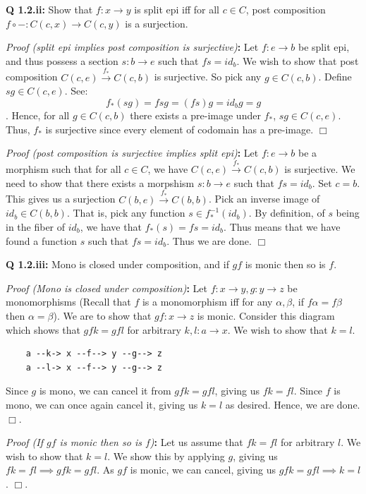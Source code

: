 \documentclass[11pt]{book}
\def\qed{$\Box$}
\newcommand{\beginproof}[1][]{\emph{Proof #1}\textbf{:} }
\newcommand{\question}[1]{\textbf{#1}}
\begin{document}
\question{Q 1.2.ii:} Show that $f: x \rightarrow y$ is split epi iff for all $c \in C$, post composition
$f \circ - : C(c, x) \rightarrow C(c, y)$ is a surjection.


\beginproof[(split epi implies post composition is surjective)]
Let $f: e \rightarrow b$ be split epi, and thus possess a section $s: b \rightarrow e$ such that $fs = id_b$.
We wish to show that post composition $C(c, e) \xrightarrow{f_*} C(c, b)$ is surjective.
So pick any $g \in C(c, b)$. Define $sg \in C(c, e)$. See: $$f_*(sg) = fsg = (fs)g = id_b g = g$$.
Hence, for all $g \in C(c, b)$ there exists a pre-image under $f_*$, $sg \in C(c, e)$. Thus, $f_*$ is surjective
since every element of codomain has a pre-image. \qed


\beginproof[(post composition is surjective implies split epi)]
Let $f: e \to b$ be a morphism such that for all $c \in C$, we have $C(c, e) \xrightarrow{f_*} C(c, b)$ is surjective.
We need to show that there exists a morpshism $s: b \rightarrow e$ such that $fs = id_b$. Set $c = b$.
This gives us a surjection $C(b, e) \xrightarrow{f_*} C(b, b)$. Pick an inverse image of $id_b \in C(b, b)$. 
That is, pick any function $s \in f_*^{-1}(id_b)$. By definition, of $s$ being in the fiber of $id_b$,
we have that $f_*(s) = fs = id_b$. Thus means that we have found a function $s$ such that $fs = id_b$. Thus we are done.
\qed

\question{Q 1.2.iii:} Mono is closed under composition, and if $gf$ is monic then so is $f$.


\beginproof[(Mono is closed under composition)]
Let $f: x \to y, g: y \to z$ be monomorphisms (Recall that $f$ is a monomorphism iff for any $\alpha, \beta$, if $f \alpha = f \beta$ then $\alpha = \beta$).
We are to show that $gf: x \to z$ is monic.
Consider this diagram which shows that $gfk = gfl$ for arbitrary $k, l: a \to x$. We wish to show that $k=l$.

\begin{verbatim}
    a --k-> x --f--> y --g--> z
    a --l-> x --f--> y --g--> z
\end{verbatim}

Since $g$ is mono, we can cancel it from $gfk = gfl$, giving us $fk = fl$.
Since $f$ is mono, we can once again cancel it, giving us $k = l$ as desired.
Hence, we are done.  \qed.

\beginproof[(If $gf$ is monic then so is $f$)]
Let us assume that $fk = fl$ for arbitrary $l$. We wish to show that $k = l$. We show this
by applying $g$, giving us $fk = fl \implies gfk = gfl$. As $gf$ is monic, we can cancel, giving
us $gfk = gfl \implies k = l$. 
\qed.
\end{document}
